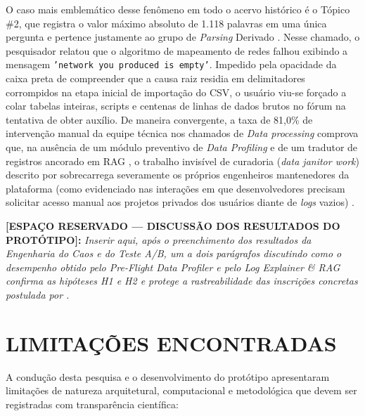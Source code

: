 \documentclass[
	oneside,
	a4paper,
	12pt,
	chapter=TITLE,
	section=TITLE,
	english,
	brazilian
]{abntex2}
\begin{document}
O caso mais emblemático desse fenômeno em todo o acervo histórico é o Tópico \#2, que registra o valor máximo absoluto de 1.118 palavras em uma única pergunta e pertence justamente ao grupo de \textit{Parsing} Derivado \cite{CorText2026}. Nesse chamado, o pesquisador relatou que o algoritmo de mapeamento de redes falhou exibindo a mensagem \texttt{'network you produced is empty'}. Impedido pela opacidade da caixa preta \cite{Latour1987} de compreender que a causa raiz residia em delimitadores corrompidos na etapa inicial de importação do CSV, o usuário viu-se forçado a colar tabelas inteiras, scripts e centenas de linhas de dados brutos no fórum na tentativa de obter auxílio. De maneira convergente, a taxa de 81,0\% de intervenção manual da equipe técnica nos chamados de \textit{Data processing} comprova que, na ausência de um módulo preventivo de \textit{Data Profiling} \cite{Wang1996,Naumann2014} e de um tradutor de registros ancorado em RAG \cite{Lewis2020}, o trabalho invisível de curadoria (\textit{data janitor work}) descrito por  sobrecarrega severamente os próprios engenheiros mantenedores da plataforma (como evidenciado nas interações em que desenvolvedores precisam solicitar acesso manual aos projetos privados dos usuários diante de \textit{logs} vazios) \cite{CorText2026}.

\begin{citacao}
\textbf{[ESPAÇO RESERVADO — DISCUSSÃO DOS RESULTADOS DO PROTÓTIPO]:} \textit{Inserir aqui, após o preenchimento dos resultados da Engenharia do Caos e do Teste A/B, um a dois parágrafos discutindo como o desempenho obtido pelo Pre-Flight Data Profiler e pelo Log Explainer \& RAG confirma as hipóteses H1 e H2 e protege a rastreabilidade das inscrições concretas postulada por .}
\end{citacao}


\FloatBarrier
\section{LIMITAÇÕES ENCONTRADAS}\label{sec:limitacoes_encontradas}


A condução desta pesquisa e o desenvolvimento do protótipo apresentaram limitações de natureza arquitetural, computacional e metodológica que devem ser registradas com transparência científica:
\end{document}

